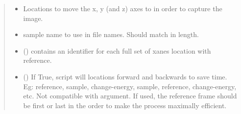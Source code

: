 \documentclass[letterpaper,10pt,english]{sphinxmanual}
\begin{document}
\begin{fulllineitems}
\begin{quote}
\begin{description}
\begin{itemize}
\item {} 
 \textendash{} Locations to move the x, y (and z) axes to in order to capture
the image.

\item {} 
 \textendash{} sample name to use in file names. Should match  in length.

\item {} 
 () \textendash{} contains an identifier for each full set of xanes location with
reference.

\item {} 
 (\sphinxstyleliteralemphasis{, }) \textendash{} If True, script will locations forward and backwards to save
time. Eg: reference, sample, change-energy, sample, reference,
change-energy, etc. Not compatible with 
argument. If used, the reference frame should be first or last
in the order to make the process maximally efficient.

\end{itemize}

\end{description}\end{quote}

\end{fulllineitems}

\end{document}

